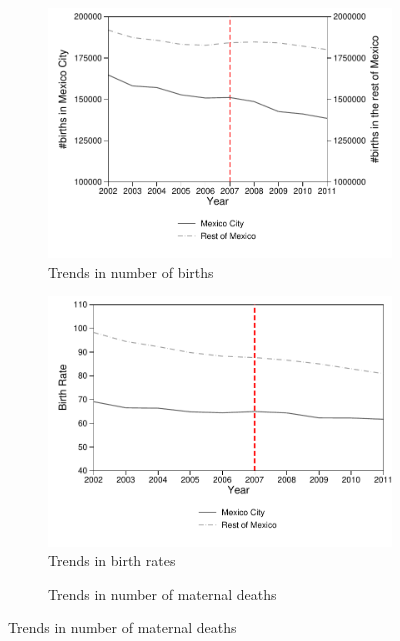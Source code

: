 \documentclass[a4paper, 11pt]{article}
\begin{document}
\begin{spacing}{2}
\begin{figure}[H]
\centering	\caption{Trends in Reform and non-Reform Areas}
\label{Trends}
\begin{subfigure}{.5\textwidth}
\centering	\caption{Trends in number of births}\label{birthTrends}
\includegraphics[scale=0.55]{figures/TrendBirth.pdf}
\end{subfigure}%
\begin{subfigure}{.5\textwidth}
\centering\caption{Trends in birth rates}\label{birthrateTrends}
\includegraphics[scale=0.55]{figures/TrendBirthRates.pdf}
\end{subfigure}
\begin{subfigure}{.5\textwidth}
\centering	\caption{Trends in number of maternal deaths}	\label{deathsTrends}

\end{subfigure}
\end{figure}
\end{spacing}
\end{document}

